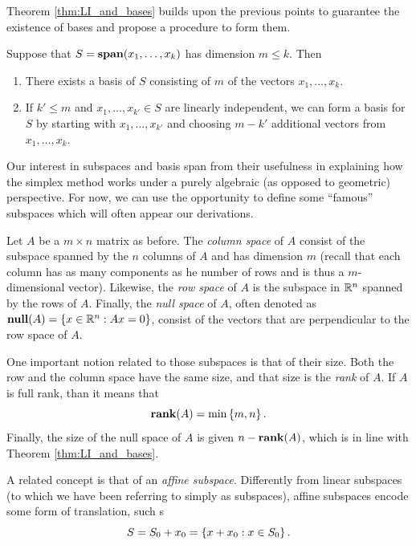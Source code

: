 Theorem \ref{thm:LI_and_bases} builds upon the previous points to guarantee the existence of bases and propose a procedure to form them.

\begin{theorem}\label{thm:LI_and_bases}
	Suppose that $S = \mathop{\bf span}(x_1,\dots, x_k)$ has dimension $m \leq k$. Then
	\begin{enumerate}
		\item There exists a basis of $S$ consisting of $m$ of the vectors $x_1,\dots, x_k$.
		\item If $k' \leq m$ and $x_1,\dots, x_{k'} \in S$ are linearly independent, we can form a basis for $S$ by starting with $x_1,\dots, x_{k'}$ and choosing $m-{k'}$ additional vectors from $x_1,\dots, x_k$.
	\end{enumerate}	
\end{theorem}


Our interest in subspaces and basis span from their usefulness in explaining how the simplex method works under a purely algebraic (as opposed to geometric) perspective. For now, we can use the opportunity to define some ``famous'' subspaces which will often appear our derivations. 

Let $A$ be a $m \times n$ matrix as before. The \emph{column space} of $A$ consist of the subspace spanned by the $n$ columns of $A$ and has dimension $m$ (recall that each column has as many components as he number of rows and is thus a $m$-dimensional vector). Likewise, the \emph{row space} of $A$ is the subspace in $\mathbb{R}^n$ spanned by the rows of $A$. Finally, the \emph{null space} of $A$, often denoted as $\mathop{\bf null}(A) = \left\{ x \in \mathbb{R}^n : Ax = 0 \right \}$, consist of the vectors that are perpendicular to the row space of $A$. 

One important notion related to those subspaces is that of their size. Both the row and the column space have the same size, and that size is the \emph{rank} of $A$. If $A$ is full rank, than it means that 
%
\begin{equation*}
	\mathop{\bf rank}(A) = \min \left\{ m,n \right \}. 		
\end{equation*}
%
Finally, the size of the null space of $A$ is given $n - \mathop{\bf rank}(A)$, which is in line with Theorem \ref{thm:LI_and_bases}.

A related concept is that of an \emph{affine subspace}. Differently from linear subspaces (to which we have been referring to simply as subspaces), affine subspaces encode some form of translation, such s  
%
\begin{equation*}
	S = S_0 + x_0 = \left\{ x + x_0 : x \in S_0 \right \}.
\end{equation*}
%

